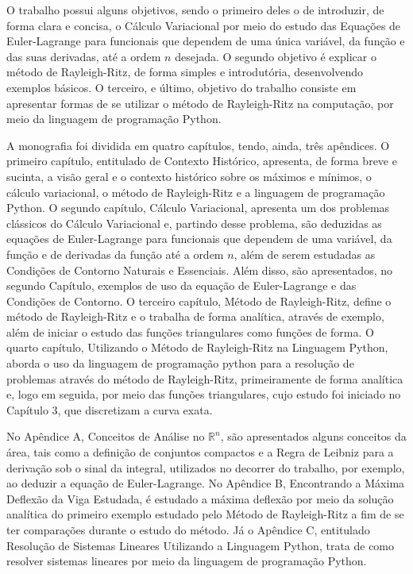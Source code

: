 \documentclass[
	12pt,				%
	openright,			%
    twoside,			%
	a4paper,			%
	english,			%
	french,				%
	spanish,			%
	brazil				%
	]{abntex2}
\numberwithin{lema}{chapter}
\numberwithin{teorema}{chapter}
\numberwithin{definicao}{chapter}
\numberwithin{exemplo}{chapter}
\numberwithin{figure}{chapter}
\begin{document}
O trabalho possui alguns objetivos, sendo o primeiro deles o de introduzir, de forma clara e concisa, o Cálculo Variacional por meio do estudo das Equações de Euler-Lagrange para funcionais que dependem de uma única variável, da função e das suas derivadas, até a ordem $n$ desejada. O segundo objetivo é explicar o método de Rayleigh-Ritz, de forma simples e introdutória, desenvolvendo exemplos básicos. O terceiro, e último, objetivo do trabalho consiste em apresentar formas de se utilizar o método de Rayleigh-Ritz na computação, por meio da linguagem de programação Python.


A monografia foi dividida em quatro capítulos, tendo, ainda, três apêndices. O primeiro capítulo, entitulado de Contexto Histórico, apresenta, de forma breve e sucinta, a visão geral e o contexto histórico sobre os máximos e mínimos, o cálculo variacional, o método de Rayleigh-Ritz e a linguagem de programação Python. O segundo capítulo, Cálculo Variacional, apresenta um dos problemas clássicos do Cálculo Variacional e, partindo desse problema, são deduzidas as equações de Euler-Lagrange para funcionais que dependem de uma variável, da função e de derivadas da função até a ordem $n$, além de serem estudadas as Condições de Contorno Naturais e Essenciais. Além disso, são apresentados, no segundo Capítulo, exemplos de uso da equação de Euler-Lagrange e das Condições de Contorno. O terceiro capítulo, Método de Rayleigh-Ritz, define o método de Rayleigh-Ritz e o trabalha de forma analítica, através de exemplo, além de iniciar o estudo das funções triangulares como funções de forma. O quarto capítulo, Utilizando o Método de Rayleigh-Ritz na Linguagem Python, aborda o uso da linguagem de programação python para a resolução de problemas através do método de Rayleigh-Ritz, primeiramente de forma analítica e, logo em seguida, por meio das funções triangulares, cujo estudo foi iniciado no Capítulo 3, que discretizam a curva exata.

No Apêndice A, Conceitos de Análise no $\mathbb{R}^n$, são apresentados alguns conceitos da área, tais como a definição de conjuntos compactos e a Regra de Leibniz para a derivação sob o sinal da integral, utilizados no decorrer do trabalho, por exemplo, ao deduzir a equação de Euler-Lagrange. No Apêndice B, Encontrando a Máxima Deflexão da Viga Estudada, é estudado a máxima deflexão por meio da solução analítica do primeiro exemplo estudado pelo Método de Rayleigh-Ritz a fim de se ter comparações durante o estudo do método. Já o Apêndice C, entitulado Resolução de Sistemas Lineares Utilizando a Linguagem Python, trata de como resolver sistemas lineares por meio da linguagem de programação Python.
\end{document}
